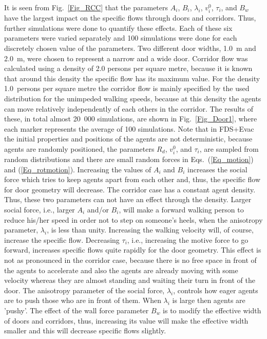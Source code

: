 \documentclass[12pt,a4paper,final,twoside]{stylevk}
\begin{document}
It is seen from Fig.~\ref{Fig_RCC} that the parameters $A_i$, $B_i$,
$\lambda_i$, $v^0_i$, $\tau_i$, and $B_w$ have the largest impact on
the specific flows through doors and corridors. Thus, further
simulations were done to quantify these effects. Each of these six
parameters were varied separately and 100 simulations were done for
each discretely chosen value of the parameters.  Two different door
widths, 1.0~m and 2.0~m, were chosen to represent a narrow and a wide
door.  Corridor flow was calculated using a density of 2.0 persons per
square metre, because it is known that around this density the
specific flow has its maximum value.  For the density 1.0~persons per
square metre the corridor flow is mainly specified by the used
distribution for the unimpeded walking speeds, because at this density
the agents can move relatively independently of each others in the
corridor.  The results of these, in total almost 20~000 simulations,
are shown in Fig.~\ref{Fig_Door1}, where each marker represents the
average of 100 simulations.  Note that in FDS+Evac the initial
properties and positions of the agents are not deterministic, because
agents are randomly positioned, the parameters $R_d$, $v^0_i$, and
$\tau_i$, are sampled from random distributions and there are small
random forces in Eqs.~(\ref{Eq_motion}) and (\ref{Eq_rotmotion}).
Increasing the values of $A_i$ and $B_i$ increases the social force
which tries to keep agents apart from each other and, thus, the
specific flow for door geometry will decrease.  The corridor case has
a constant agent density.  Thus, these two parameters can not have an
effect through the density.  Larger social force, i.e., larger
$A_i$ and/or $B_i$, will make a forward walking person to reduce
his/her speed in order not to step on someone's heels, when the
anisotropy parameter, $\lambda_i$, is less than unity.  Increasing the
walking velocity will, of course, increase the specific flow.
Decreasing $\tau_i$, i.e., increasing the motive force to go
forward, increases specific flows quite rapidly for the door geometry.
This effect is not as pronounced in the corridor case, because there
is no free space in front of the agents to accelerate and also the
agents are already moving with some velocity whereas they are almost
standing and waiting their turn in front of the door.  The anisotropy
parameter of the social force, $\lambda_i$, controls how eager agents
are to push those who are in front of them.  When $\lambda_i$ is large
then agents are 'pushy'.  The effect of the wall force parameter $B_w$
is to modify the effective width of doors and corridors, thus,
increasing its value will make the effective width smaller and this
will decrease specific flows slightly.
\end{document}
